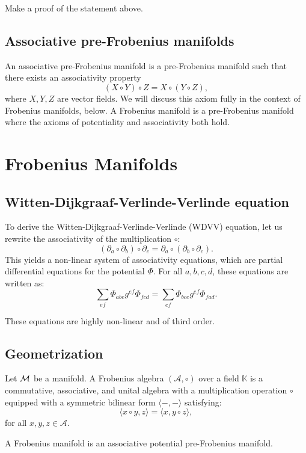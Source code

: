 \begin{ex}\label{Ex:Ma}
    Make a proof of the statement above.
\end{ex}

\subsection{Associative pre-Frobenius manifolds}
An associative pre-Frobenius manifold is a pre-Frobenius manifold such that there exists an associativity property \[(X \circ Y)\circ Z=X\circ(Y\circ Z),\]
where $X,Y,Z$ are vector fields. We will discuss this axiom fully in the context of Frobenius manifolds, below.  A Frobenius manifold is a pre-Frobenius manifold where the axioms of potentiality and associativity both hold. 
\section{Frobenius Manifolds}
\subsection{Witten-Dijkgraaf-Verlinde-Verlinde equation}

To derive the Witten-Dijkgraaf-Verlinde-Verlinde (WDVV) equation, let us rewrite the associativity of the multiplication $\circ$:
\[
(\partial_a \circ \partial_b) \circ \partial_c = \partial_a \circ (\partial_b \circ \partial_c).
\]
This yields a non-linear system of associativity equations, which are partial differential equations for the potential $\Phi$. For all $a, b, c, d$, these equations are written as:
\[
\sum_{ef} \Phi_{abe} g^{ef} \Phi_{fcd} = \sum_{ef} \Phi_{bce} g^{ef} \Phi_{fad}.
\]

These equations are highly non-linear and of third order.


\subsection{Geometrization}


Let $\mathcal{M}$ be a manifold. A Frobenius algebra $(\mathcal{A}, \circ)$ over a field $\mathbb{K}$ is a commutative, associative, and unital algebra with a multiplication operation $\circ$ equipped with a symmetric bilinear form $\langle -, - \rangle$ satisfying:
\[
\langle x \circ y, z \rangle = \langle x, y \circ z \rangle,
\]
for all $x, y, z \in \mathcal{A}$.

\begin{definition}
A Frobenius manifold is an associative potential pre-Frobenius manifold.
\end{definition}

